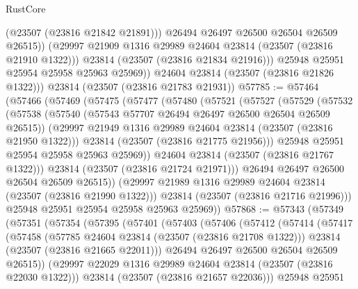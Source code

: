 \begin{lexlean}{RustCore}
\begin{coremodule}
                  (@23507 (@23816 @21842 @21891)))
                @26494
                @26497
                @26500
                @26504
                @26509
                @26515))
            (@29997 @21909 @1316 @29989 @24604 @23814 (@23507 (@23816 @21910 @1322)))
            @23814
            (@23507 (@23816 @21834 @21916)))
          @25948
          @25951
          @25954
          @25958
          @25963
          @25969))
      @24604
      @23814
      (@23507 (@23816 @21826 @1322)))
    @23814
    (@23507 (@23816 @21783 @21931))
@57785 := @57464
    (@57466
      (@57469
        (@57475
          (@57477
            (@57480
              (@57521
                (@57527
                  (@57529
                    (@57532
                      (@57538
                        (@57540 (@57543 @57707 @26494 @26497 @26500 @26504 @26509 @26515))
                        (@29997 @21949 @1316 @29989 @24604 @23814 (@23507 (@23816 @21950 @1322)))
                        @23814
                        (@23507 (@23816 @21775 @21956)))
                      @25948
                      @25951
                      @25954
                      @25958
                      @25963
                      @25969))
                  @24604
                  @23814
                  (@23507 (@23816 @21767 @1322)))
                @23814
                (@23507 (@23816 @21724 @21971)))
              @26494
              @26497
              @26500
              @26504
              @26509
              @26515))
          (@29997 @21989 @1316 @29989 @24604 @23814 (@23507 (@23816 @21990 @1322)))
          @23814
          (@23507 (@23816 @21716 @21996)))
        @25948
        @25951
        @25954
        @25958
        @25963
        @25969))
@57868 := @57343
    (@57349
      (@57351
        (@57354
          (@57395
            (@57401
              (@57403
                (@57406
                  (@57412
                    (@57414
                      (@57417
                        (@57458
                          (@57785 @24604 @23814 (@23507 (@23816 @21708 @1322)))
                          @23814
                          (@23507 (@23816 @21665 @22011)))
                        @26494
                        @26497
                        @26500
                        @26504
                        @26509
                        @26515))
                    (@29997 @22029 @1316 @29989 @24604 @23814 (@23507 (@23816 @22030 @1322)))
                    @23814
                    (@23507 (@23816 @21657 @22036)))
                  @25948
                  @25951

\end{coremodule}
\end{lexlean}
